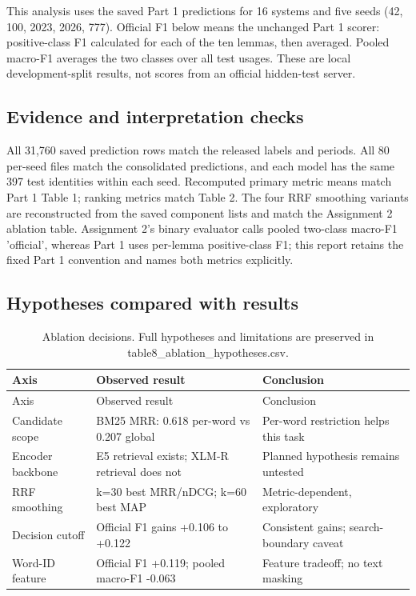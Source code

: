 This analysis uses the saved Part 1 predictions for 16 systems and five seeds (42, 100, 2023, 2026, 777). Official F1 below means the unchanged Part 1 scorer: positive-class F1 calculated for each of the ten lemmas, then averaged. Pooled macro-F1 averages the two classes over all test usages. These are local development-split results, not scores from an official hidden-test server.

\subsection{Evidence and interpretation checks}
All 31,760 saved prediction rows match the released labels and periods. All 80 per-seed files match the consolidated predictions, and each model has the same 397 test identities within each seed. Recomputed primary metric means match Part 1 Table 1; ranking metrics match Table 2. The four RRF smoothing variants are reconstructed from the saved component lists and match the Assignment 2 ablation table. Assignment 2's binary evaluator calls pooled two-class macro-F1 'official', whereas Part 1 uses per-lemma positive-class F1; this report retains the fixed Part 1 convention and names both metrics explicitly.

\subsection{Hypotheses compared with results}
{\small
\setlength{\tabcolsep}{3pt}
\begin{longtable}{>{\raggedright\arraybackslash}p{}>{\raggedright\arraybackslash}p{}>{\raggedright\arraybackslash}p{}}
\caption{Ablation decisions. Full hypotheses and limitations are preserved in table8\_ablation\_hypotheses.csv.}\\
\toprule
Axis & Observed result & Conclusion \\
\midrule
\endfirsthead
Axis & Observed result & Conclusion \\
\midrule
\endhead
Candidate scope & BM25 MRR: 0.618 per-word vs 0.207 global & Per-word restriction helps this task \\
Encoder backbone & E5 retrieval exists; XLM-R retrieval does not & Planned hypothesis remains untested \\
RRF smoothing & k=30 best MRR/nDCG; k=60 best MAP & Metric-dependent, exploratory \\
Decision cutoff & Official F1 gains +0.106 to +0.122 & Consistent gains; search-boundary caveat \\
Word-ID feature & Official F1 +0.119; pooled macro-F1 -0.063 & Feature tradeoff; no text masking \\
\bottomrule
\end{longtable}
}

